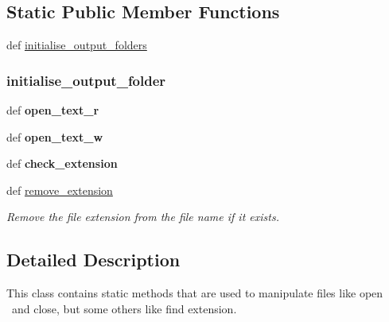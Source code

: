 \subsection*{Static Public Member Functions}
\begin{DoxyCompactItemize}
\item 
def \hyperlink{classsrc_1_1fr_1_1tagc_1_1rainet_1_1core_1_1util_1_1file_1_1FileUtils_1_1FileUtils_acfc8804244b1c549456d8c000b23163d}{initialise\-\_\-output\-\_\-folders}
\begin{DoxyCompactList}\small\item\em \subsubsection*{initialise\-\_\-output\-\_\-folder }\end{DoxyCompactList}\item 
\hypertarget{classsrc_1_1fr_1_1tagc_1_1rainet_1_1core_1_1util_1_1file_1_1FileUtils_1_1FileUtils_acd192c7ce19c8e57ed735f73f5fbbc07}{def {\bfseries open\-\_\-text\-\_\-r}}\label{classsrc_1_1fr_1_1tagc_1_1rainet_1_1core_1_1util_1_1file_1_1FileUtils_1_1FileUtils_acd192c7ce19c8e57ed735f73f5fbbc07}

\item 
\hypertarget{classsrc_1_1fr_1_1tagc_1_1rainet_1_1core_1_1util_1_1file_1_1FileUtils_1_1FileUtils_acf2cc959f240addda567709e355594e2}{def {\bfseries open\-\_\-text\-\_\-w}}\label{classsrc_1_1fr_1_1tagc_1_1rainet_1_1core_1_1util_1_1file_1_1FileUtils_1_1FileUtils_acf2cc959f240addda567709e355594e2}

\item 
\hypertarget{classsrc_1_1fr_1_1tagc_1_1rainet_1_1core_1_1util_1_1file_1_1FileUtils_1_1FileUtils_a9b4c9a8d1b47ae2b143a62b81e97fa2b}{def {\bfseries check\-\_\-extension}}\label{classsrc_1_1fr_1_1tagc_1_1rainet_1_1core_1_1util_1_1file_1_1FileUtils_1_1FileUtils_a9b4c9a8d1b47ae2b143a62b81e97fa2b}

\item 
def \hyperlink{classsrc_1_1fr_1_1tagc_1_1rainet_1_1core_1_1util_1_1file_1_1FileUtils_1_1FileUtils_a91725c6617f746588f494634873d65da}{remove\-\_\-extension}
\begin{DoxyCompactList}\small\item\em Remove the file extension from the file name if it exists. \end{DoxyCompactList}\end{DoxyCompactItemize}


\subsection{Detailed Description}
This class contains static methods that are used to manipulate files like open  and close, but some others like find extension. 


